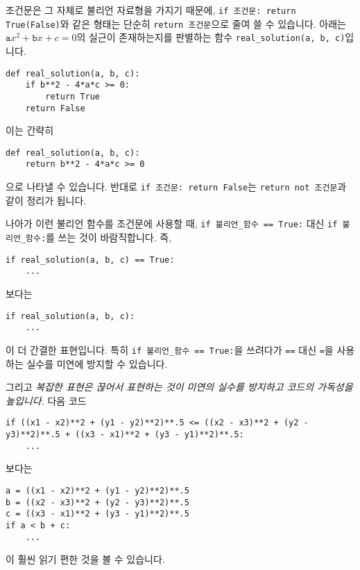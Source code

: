 \documentclass[../main.tex]{subfiles}
\begin{document}
조건문은 그 자체로 불리언 자료형을 가지기 때문에, \texttt{if 조건문: return True(False)}와 같은 형태는 단순히 \texttt{return 조건문}으로 줄여 쓸 수 있습니다.
아래는 $\texttt{a}x^2 + \texttt{b}x + c = 0$의 실근이 존재하는지를 판별하는 함수 \texttt{real\_solution(a, b, c)}입니다.
\begin{verbatim}
def real_solution(a, b, c):
    if b**2 - 4*a*c >= 0:
        return True
    return False
\end{verbatim}
이는 간략히 
\begin{verbatim}
def real_solution(a, b, c):
    return b**2 - 4*a*c >= 0
\end{verbatim}
으로 나타낼 수 있습니다.
반대로 \texttt{if 조건문: return False}는 \texttt{return not 조건문}과 같이 정리가 됩니다.

나아가 이런 불리언 함수를 조건문에 사용할 때, \texttt{if 불리언\_함수 == True:} 대신 \texttt{if 불리언\_함수:}를 쓰는 것이 바람직합니다.
즉,
\begin{verbatim}
if real_solution(a, b, c) == True:
    ...
\end{verbatim}
보다는
\begin{verbatim}
if real_solution(a, b, c):
    ...
\end{verbatim}
이 더 간결한 표현입니다.
특히 \texttt{if 불리언\_함수 == True:}을 쓰려다가 \texttt{==} 대신 \texttt{=}을 사용하는 실수를 미연에 방지할 수 있습니다.

그리고 \emph{복잡한 표현은 끊어서 표현하는 것이 미연의 실수를 방지하고 코드의 가독성을 높입니다.}
다음 코드
\begin{verbatim}
if ((x1 - x2)**2 + (y1 - y2)**2)**.5 <= ((x2 - x3)**2 + (y2 - y3)**2)**.5 + ((x3 - x1)**2 + (y3 - y1)**2)**.5:
    ...
\end{verbatim}
보다는
\begin{verbatim}
a = ((x1 - x2)**2 + (y1 - y2)**2)**.5
b = ((x2 - x3)**2 + (y2 - y3)**2)**.5
c = ((x3 - x1)**2 + (y3 - y1)**2)**.5
if a < b + c:
    ...
\end{verbatim}
이 훨씬 읽기 편한 것을 볼 수 있습니다.
\end{document}
